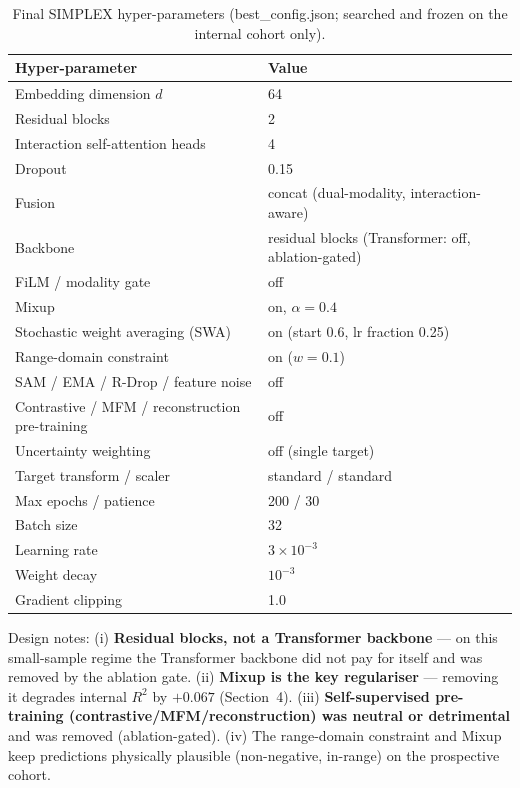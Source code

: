 \documentclass[utf8]{frontiers_suppmat}
\begin{document}
\begin{table}[h]
\centering
\caption{Final SIMPLEX hyper-parameters (best\_config.json; searched and frozen on the internal cohort only).}
\label{tab:hyper}
\begin{tabular}{ll}
\toprule
Hyper-parameter & Value \\
\midrule
Embedding dimension $d$ & 64 \\
Residual blocks & 2 \\
Interaction self-attention heads & 4 \\
Dropout & 0.15 \\
Fusion & concat (dual-modality, interaction-aware) \\
Backbone & residual blocks (Transformer: off, ablation-gated) \\
FiLM / modality gate & off \\
Mixup & on, $\alpha = 0.4$ \\
Stochastic weight averaging (SWA) & on (start 0.6, lr fraction 0.25) \\
Range-domain constraint & on ($w = 0.1$) \\
SAM / EMA / R-Drop / feature noise & off \\
Contrastive / MFM / reconstruction pre-training & off \\
Uncertainty weighting & off (single target) \\
Target transform / scaler & standard / standard \\
Max epochs / patience & 200 / 30 \\
Batch size & 32 \\
Learning rate & $3\times10^{-3}$ \\
Weight decay & $10^{-3}$ \\
Gradient clipping & 1.0 \\
\bottomrule
\end{tabular}
\end{table}

Design notes: (i) \textbf{Residual blocks, not a Transformer backbone} ---
on this small-sample regime the Transformer backbone did not pay for itself
and was removed by the ablation gate. (ii) \textbf{Mixup is the key
regulariser} --- removing it degrades internal $R^2$ by $+0.067$ (Section~4).
(iii) \textbf{Self-supervised pre-training (contrastive/MFM/reconstruction)
was neutral or detrimental} and was removed (ablation-gated). (iv) The
range-domain constraint and Mixup keep predictions physically plausible
(non-negative, in-range) on the prospective cohort.
\end{document}
